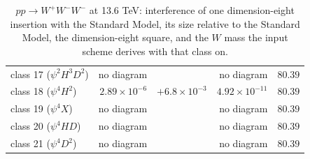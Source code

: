 \begin{table}[t]
\begin{tabular}{@{}lrrrr@{}}
class 17 ($\psi^2 H^3 D^2$) & no diagram &  & no diagram & $80.39$\\
class 18 ($\psi^4 H^2$) & $2.89\times 10^{-6}$ & $+6.8\times 10^{-3}$ & $4.92\times 10^{-11}$ & $80.39$\\
class 19 ($\psi^4 X$) & no diagram &  & no diagram & $80.39$\\
class 20 ($\psi^4 H D$) & no diagram &  & no diagram & $80.39$\\
class 21 ($\psi^4 D^2$) & no diagram &  & no diagram & $80.39$\\
\hline\end{tabular}
\caption{$p p \to W^+ W^- W^-$ at 13.6 TeV: interference of one dimension-eight insertion with the Standard Model, its size relative to the Standard Model, the dimension-eight square, and the $W$ mass the input scheme derives with that class on.}\label{tab:triboson-wpwmwm}\end{table}

